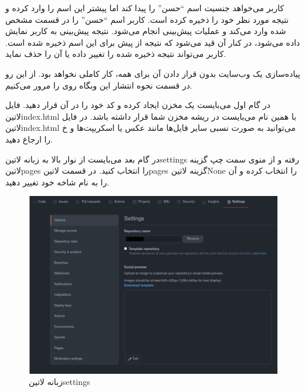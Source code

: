 \documentclass[../main.tex]{subfiles}
\begin{document}
 کاربر می‌خواهد جنسیت اسم ``حسن'' را پیدا کند اما پیشتر این اسم را وارد کرده و نتیجه مورد نظر خود را ذخیره کرده است.
 کاربر اسم ``حسن'' را در قسمت مشخص شده وارد می‌کند و عملیات پیش‌بینی انجام می‌شود.
 نتیجه پیش‌بینی به کاربر نمایش داده می‌شود، در کنار آن قید می‌شود که نتیجه از پیش برای این اسم ذخیره شده است.
 کاربر می‌تواند نتیجه ذخیره شده را تغییر داده یا آن را حذف نماید.

پیاده‌سازی یک وب‌سایت بدون قرار دادن آن برای همه، کار کاملی نخواهد بود. از این رو در قسمت نحوه انتشار این وبگاه روی  را مرور می‌کنیم.

در گام اول می‌بایست یک مخزن ایجاد کرده و کد خود را در آن قرار دهید. فایل ‌لاتین{index.html} با همین نام می‌بایست در ریشه مخزن شما قرار داشته باشد.
در فایل ‌لاتین{index.html} می‌توانید به صورت نسبی سایر فایل‌ها مانند عکس یا اسکریپت‌ها و ‌خ را ارجاع دهید.

در گام بعد می‌بایست از نوار بالا به زبانه ‌لاتین{settings} رفته و از منوی سمت چپ گزینه ‌لاتین{pages} را انتخاب کنید.
در قسمت ‌لاتین{pages} گزینه ‌لاتین{None} را انتخاب کرده و آن را به نام شاخه خود تغییر دهید.

\begin{figure}[h]
  \centering
  \includegraphics[scale=0.3]{./github-step-1}
  \caption{زبانه ‌لاتین{settings}}
\end{figure}
\end{document}
